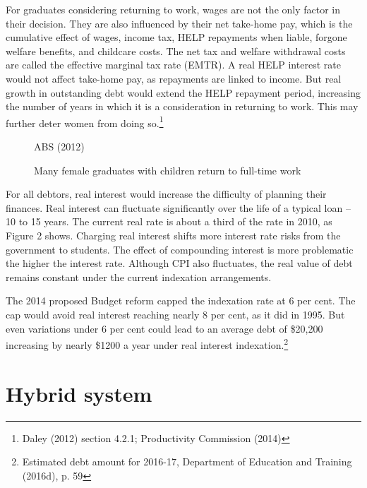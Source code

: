 \documentclass[embargoed]{grattan}
\begin{document}
For graduates considering returning to work, wages are not the only factor in their decision. They are also influenced by their net take-home pay, which is the cumulative effect of wages, income tax, HELP repayments when liable, forgone welfare benefits, and childcare costs. The net tax and welfare withdrawal costs are called the effective marginal tax rate (EMTR). A real HELP interest rate would not affect take-home pay, as repayments are linked to income. But real growth in outstanding debt would extend the HELP repayment period, increasing the number of years in which it is a consideration in returning to work. This may further deter women from doing so.\footnote{Daley (2012) section 4.2.1; Productivity Commission (2014)}

\begin{figure}
\caption{Many female graduates with children return to full-time work}\label{fig:fig16-many-female-grads-with-children-return-to-full-time-work}


{ABS (2012)}
\end{figure}


For all debtors, real interest would increase the difficulty of planning their finances. Real interest can fluctuate significantly over the life of a typical loan -- 10 to 15 years. The current real rate is about a third of the rate in 2010, as Figure 2 shows. Charging real interest shifts more interest rate risks from the government to students. The effect of compounding interest is more problematic the higher the interest rate. Although CPI also fluctuates, the real value of debt remains constant under the current indexation arrangements.

The 2014 proposed Budget reform capped the indexation rate at 6 per cent. The cap would avoid real interest reaching nearly 8 per cent, as it did in 1995. But even variations under 6 per cent could lead to an average debt of \$20,200 increasing by nearly \$1200 a year under real interest indexation.\footnote{Estimated debt amount for 2016-17, Department of Education and Training (2016d), p. 59}

\section{Hybrid system}\label{sec:hybrid-system}
\end{document}

